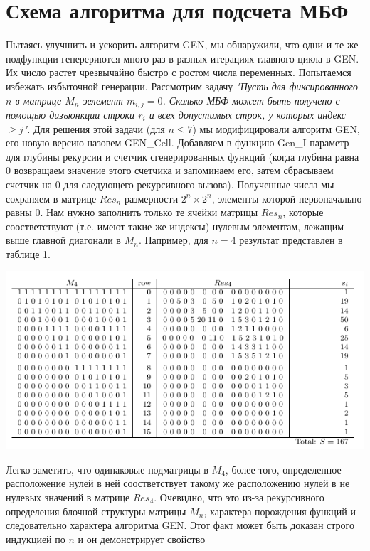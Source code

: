 \chapter{Схема алгоритма для подсчета МБФ}
Пытаясь улучшить и ускорить алгоритм GEN, мы обнаружили, что одни и те же подфункции
генерериются много раз в разных итерациях главного цикла в GEN.
Их число растет чрезвычайно быстро с ростом числа переменных.
Попытаемся избежать избыточной генерации.
Рассмотрим задачу 
\emph{
"Пусть для фиксированного $n$ в матрице $M_n$ эелемент $m_{i,j} = 0$. 
Сколько МБФ может быть получено с помощью дизъюнкции строки $r_i$ и всех
допустимых строк, у которых индекс $\ge j$".
}
Для решения этой задачи (для $n \leq 7$) мы модифицировали алгоритм GEN, его
новую версию назовем GEN\_Cell. Добавляем в функцию Gen\_I параметр для глубины
рекурсии и счетчик сгенерированных функций (когда глубина равна $0$ возвращаем
значение этого счетчика и запоминаем его, затем сбрасываем счетчик на $0$
для следующего рекурсивного вызова). Полученные числа мы сохраняем в матрице
$Res_n$ размерности $2^n \times 2^n$, элементы которой первоначально равны $0$.
Нам нужно заполнить только те ячейки матрицы $Res_n$, которые соостветствуют 
(т.е. имеют такие же индексы) нулевым элементам, лежащим выше главной диагонали в
$M_n$. Например, для $n=4$ результат представлен 
в таблице 1.
\begin{center}
\label{pic:TableRes_4}
\includegraphics[]{table_res_4_example.png}
\end{center}
Легко заметить, что одинаковые подматрицы в $M_4$, более того,
определенное расположение нулей в ней соостветствует такому же расположению
нулей в не нулевых значений в матрице $Res_4$.
Очевидно, что это из-за рекурсивного определения блочной структуры матрицы $M_n$,
характера порождения функций и следовательно характера алгоритма GEN.
Этот факт может быть доказан строго индукцией по $n$ и он демонстрирует свойство

